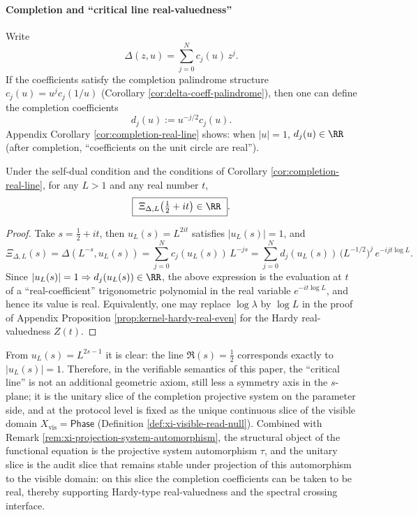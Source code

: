 \paragraph{Completion and ``critical line real-valuedness''}
Write
\[
\Delta(z,u)=\sum_{j=0}^{N}c_j(u)\,z^j.
\]
If the coefficients satisfy the completion palindrome structure \(c_j(u)=u^j c_j(1/u)\) (Corollary \ref{cor:delta-coeff-palindrome}), then one can define the completion coefficients
\[
d_j(u):=u^{-j/2}c_j(u).
\]
Appendix Corollary \ref{cor:completion-real-line} shows: when \(|u|=1\), \(d_j(u)\in\RR\) (after completion, ``coefficients on the unit circle are real'').

\begin{proposition}\label{prop:xi-delta-L-critical-line-real}
Under the self-dual condition and the conditions of Corollary \ref{cor:completion-real-line}, for any \(L>1\) and any real number \(t\),
\[
\boxed{\ \Xi_{\Delta,L}\!\left(\tfrac12+it\right)\in\RR\ }.
\]
\end{proposition}
\begin{proof}
Take \(s=\tfrac12+it\), then \(u_L(s)=L^{2it}\) satisfies \(|u_L(s)|=1\), and
\[
\Xi_{\Delta,L}(s)
=\Delta(L^{-s},u_L(s))
=\sum_{j=0}^{N}c_j(u_L(s))\,L^{-js}
=\sum_{j=0}^{N}d_j(u_L(s))\,\bigl(L^{-1/2}\bigr)^{j}\,e^{-ijt\log L}.
\]
Since \(|u_L(s)|=1\Rightarrow d_j(u_L(s))\in\RR\), the above expression is the evaluation at \(t\) of a ``real-coefficient'' trigonometric polynomial in the real variable \(e^{-it\log L}\), and hence its value is real. Equivalently, one may replace \(\log\lambda\) by \(\log L\) in the proof of Appendix Proposition \ref{prop:kernel-hardy-real-even} for the Hardy real-valuedness \(Z(t)\).
\end{proof}

\begin{remark}\label{rem:xi-critical-line-unit-circle}
From \(u_L(s)=L^{2s-1}\) it is clear: the line \(\Re(s)=\tfrac12\) corresponds exactly to \(|u_L(s)|=1\).
Therefore, in the verifiable semantics of this paper, the ``critical line'' is not an additional geometric axiom, still less a symmetry axis in the \(s\)-plane; it is the unitary slice of the completion projective system on the parameter side, and at the protocol level is fixed as the unique continuous slice of the visible domain \(X_{\mathrm{vis}}=\mathsf{Phase}\) (Definition \ref{def:xi-visible-read-null}).
Combined with Remark \ref{rem:xi-projection-system-automorphism}, the structural object of the functional equation is the projective system automorphism \(\tau\), and the unitary slice is the audit slice that remains stable under projection of this automorphism to the visible domain: on this slice the completion coefficients can be taken to be real, thereby supporting Hardy-type real-valuedness and the spectral crossing interface.
\end{remark}

